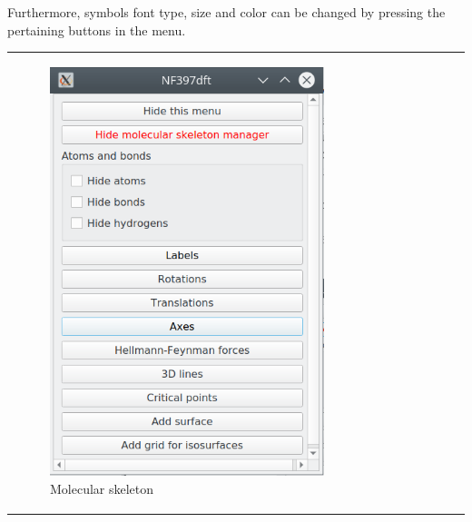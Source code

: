 \documentclass[10pt]{article}
\begin{document}
Furthermore, symbols font type, size and color can be changed by pressing the 
pertaining buttons in the menu. 

\begin{tabular}{lcr}
\begin{minipage}{.3\linewidth}
    \begin{figure}[H]
        \begin{center}
            \includegraphics[width=0.8\linewidth]{damqt320_molecular_skeleton.png}
        \end{center}
        \vspace*{17mm}
        \caption{Molecular skeleton \label{fig:4_13_1_1}}
    \end{figure}
\end{minipage}
&
\begin{minipage}{.3\linewidth}
    \begin{figure}[H]
        \begin{center}
            \vspace*{0mm}

\end{center}
\end{figure}
\end{minipage}
\end{tabular}
\end{document}
